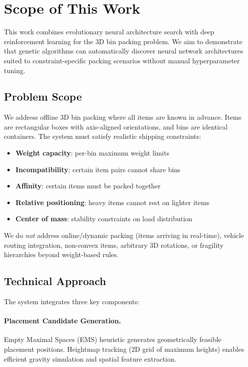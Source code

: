\section{Scope of This Work}

This work combines evolutionary neural architecture search with deep reinforcement learning for the 3D bin packing problem. We aim to demonstrate that genetic algorithms can automatically discover neural network architectures suited to constraint-specific packing scenarios without manual hyperparameter tuning.

\subsection{Problem Scope}

We address offline 3D bin packing where all items are known in advance. Items are rectangular boxes with axis-aligned orientations, and bins are identical containers. The system must satisfy realistic shipping constraints:
\begin{itemize}
    \item \textbf{Weight capacity}: per-bin maximum weight limits
    \item \textbf{Incompatibility}: certain item pairs cannot share bins
    \item \textbf{Affinity}: certain items must be packed together
    \item \textbf{Relative positioning}: heavy items cannot rest on lighter items
    \item \textbf{Center of mass}: stability constraints on load distribution
\end{itemize}

We do \emph{not} address online/dynamic packing (items arriving in real-time), vehicle routing integration, non-convex items, arbitrary 3D rotations, or fragility hierarchies beyond weight-based rules.

\subsection{Technical Approach}

The system integrates three key components:

\paragraph{Placement Candidate Generation.}
Empty Maximal Spaces (EMS) heuristic generates geometrically feasible placement positions. Heightmap tracking (2D grid of maximum heights) enables efficient gravity simulation and spatial feature extraction.


